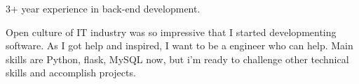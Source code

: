 

\begin{cvparagraph}

3+ year experience in back-end development.

Open culture of IT industry was so impressive that I started developmenting software. As I got help and inspired, I want to be a engineer who can help.
Main skills are Python, flask, MySQL now, but i'm ready to challenge other technical skills and accomplish projects.

\end{cvparagraph}
